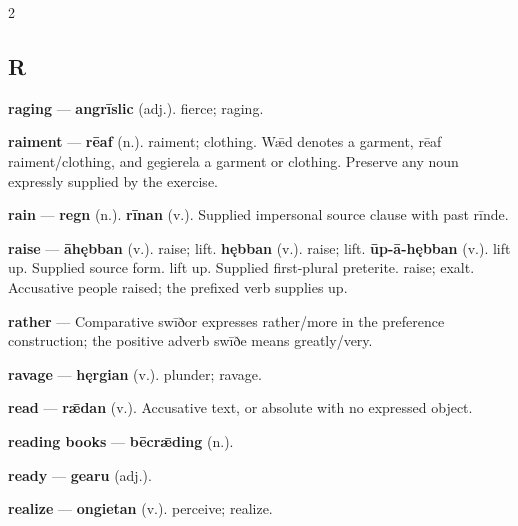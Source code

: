 \begin{multicols}{2}
\subsection*{R}
\textbf{raging} — \textbf{angrīslic} (adj.). fierce; raging.\par
\textbf{raiment} — \textbf{rēaf} (n.). raiment; clothing. Wǣd denotes a garment, rēaf raiment/clothing, and gegierela a garment or clothing. Preserve any noun expressly supplied by the exercise.\par
\textbf{rain} — \textbf{regn} (n.).  \textbf{rīnan} (v.). Supplied impersonal source clause with past rīnde.\par
\textbf{raise} — \textbf{āhębban} (v.). raise; lift. \textbf{hębban} (v.). raise; lift. \textbf{ūp-ā-hębban} (v.). lift up. Supplied source form. lift up. Supplied first-plural preterite. raise; exalt. Accusative people raised; the prefixed verb supplies up.\par
\textbf{rather} — Comparative swīðor expresses rather/more in the preference construction; the positive adverb swīðe means greatly/very.\par
\textbf{ravage} — \textbf{hęrgian} (v.). plunder; ravage.\par
\textbf{read} — \textbf{rǣdan} (v.). Accusative text, or absolute with no expressed object.\par
\textbf{reading books} — \textbf{bēcrǣding} (n.).\par
\textbf{ready} — \textbf{gearu} (adj.).\par
\textbf{realize} — \textbf{ongietan} (v.). perceive; realize.\par

\end{multicols}
